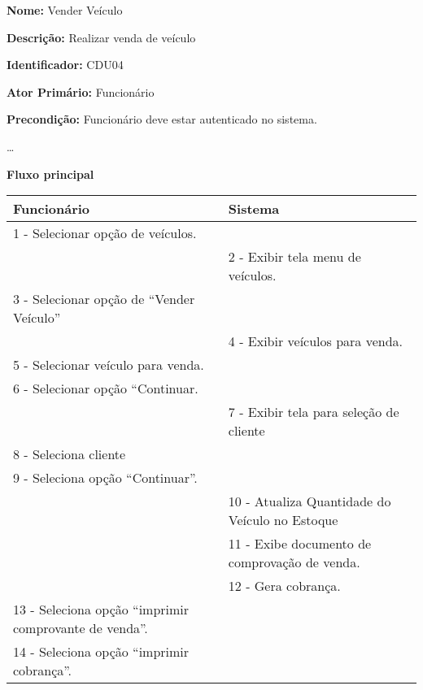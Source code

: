 	\par
	\textbf{Nome:} Vender Veículo 
	\par
	\textbf{Descrição:} Realizar venda de veículo 
	\par 
	\textbf{Identificador:} CDU04
	\par
	\textbf{Ator Primário:} Funcionário	
	\par
	\textbf{Precondição:} Funcionário deve estar autenticado no sistema.
	\par	
	\ldots
	\par
	\textbf{Fluxo principal}\par
	\begin{tabular}{|p{7cm}|p{7cm}|}
		\hline 
		
		
		Funcionário
		& 
		
		Sistema
		\\ 
		\hline 
		
		
		1 - Selecionar opção de veículos.
		&  \\ 
		\hline 
		& 
		
		2 - Exibir tela menu de veículos.
		\\ 
		\hline 
		
		
		3 - Selecionar opção de “Vender Veículo”
		&  \\ 
		\hline 
		& 
		
		4 - Exibir veículos para venda.
		\\ 
		\hline 
		
		
		5 - Selecionar veículo para venda.
		&  \\ 
		\hline 
		
		
		6 - Selecionar opção “Continuar.
		&  \\ 
		\hline 
		& 
		
		7 - Exibir tela para seleção de cliente
		\\ 
		\hline 
		
		
		8 - Seleciona cliente
		&  \\ 
		\hline 
		
		
		9 - Seleciona opção “Continuar”. 
		&  \\ 
		\hline 
		& 
		
		10 - Atualiza Quantidade do Veículo no Estoque
		\\ 
		\hline 
		& 
		
		11 - Exibe documento de comprovação de venda. 
		\\ 
		\hline 
		& 
		
		12 - Gera cobrança.
		\\ 
		\hline 
		
		
		13 - Seleciona opção “imprimir comprovante de venda”.
		&  \\ 
		\hline 
		
		
		14 - Seleciona opção “imprimir cobrança”.
		&  \\ 
		\hline 
	\end{tabular}  
	\vspace{12px}



